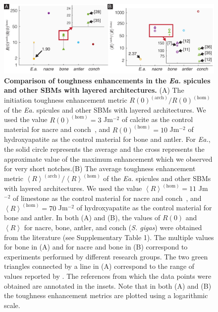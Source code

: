\documentclass[12pt,onecolumn]{article}
\makeatletter
\newcommand{\EA}{\textit{Ea.\@}\xspace}
\makeatother
\begin{document}
			\begin{figure}[ht!]
			\centering
			\includegraphics[width=\textwidth]{../Figures/FigureSBMcomp/Figure6_V5.pdf}
			\caption{
			\textbf{Comparison of toughness enhancements in the \EA spicules and other SBMs with layered architectures.} (A)  The initiation toughness enhancement metric $R(0)^{(\mathrm{arch})}/R(0)^{(\mathrm{hom})}$ of the \EA spicules and other SBMs with layered architectures. We used the value $R(0)^{(\mathrm{hom})}=3$ Jm$^{-2}$ of calcite as the control material for nacre and conch~\cite{wegst2004mechanical}, and $R(0)^{(\mathrm{hom})}=10$ Jm$^{-2}$ of hydroxyapatite \cite{wegst2004mechanical} as the control material for bone and antler. For \EA, the solid circle represents the average and the cross represents the approximate value of the maximum enhancement which we observed for very short notches.(B) The average toughness enhancement metric $\left< R\right>^{(\mathrm{arch})}/\left< R\right>^{(\mathrm{hom})}$ of the \EA spicules and other SBMs with layered architectures. We used the value $\left< R\right>^{(\mathrm{hom})}=11$ Jm$^{-2}$ of limestone as the control material for nacre and conch~\cite{carmichael1982crc}, and $\left< R\right>^{(\mathrm{hom})}=70$ Jm$^{-2}$ of hydroxyapatite \cite{tenhuisen1995formation} as the control material for bone and antler. In both (A) and (B), the values of $R(0)$ and $\left< R \right>$ for nacre, bone, antler, and conch (\textit{S. gigas}) were obtained from the literature (see Supplementary Table 1). The multiple values for bone in (A) and for nacre and bone in (B) correspond to experiments performed by different research groups. The two green triangles connected by a line in (A) correspond to the range of values reported by \cite{koester2008true}. The references from which the data points were obtained are annotated in the insets. Note that in both (A) and (B) the toughness enhancement metrics are plotted using a logarithmic scale.
			}
			\label{fig:SBMcomp}
			\end{figure}

\end{document}
